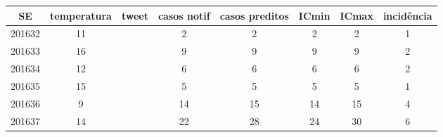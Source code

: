 \begin{tabular}{c|ccccccc}
  \hline
SE & temperatura & tweet & casos notif & casos preditos & ICmin & ICmax & incidência \\ 
  \hline
201632 & 11 &  & 2 & 2 & 2 & 2 & 1 \\ 
  201633 & 16 &  & 9 & 9 & 9 & 9 & 2 \\ 
  201634 & 12 &  & 6 & 6 & 6 & 6 & 2 \\ 
  201635 & 15 &  & 5 & 5 & 5 & 5 & 1 \\ 
  201636 & 9 &  & 14 & 15 & 14 & 15 & 4 \\ 
  201637 & 14 &  & 22 & 28 & 24 & 30 & 6 \\ 
   \hline
\end{tabular}
